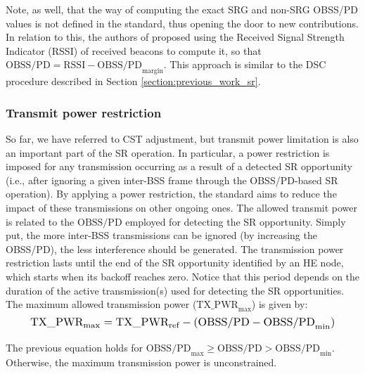 \documentclass{article}
\begin{document}
Note, as well, that the way of computing the exact SRG and non-SRG OBSS/PD values is not defined in the standard, thus opening the door to new contributions. In relation to this, the authors of \cite{tgax2016obss_pd_evaluation} proposed using the Received Signal Strength Indicator (RSSI) of received beacons to compute it, so that $\text{OBSS/PD} =  \text{RSSI} - \text{OBSS/PD}_{\text{margin}}$. This approach is similar to the DSC procedure described in Section \ref{section:previous_work_sr}.

\subsubsection{Transmit power restriction}	\label{section:tx_power_restriction}
So far, we have referred to CST adjustment, but transmit power limitation is also an important part of the SR operation. In particular, a power restriction is imposed for any transmission occurring as a result of a detected SR opportunity (i.e., after ignoring a given inter-BSS frame through the OBSS/PD-based SR operation). By applying a power restriction, the standard aims to reduce the impact of these transmissions on other ongoing ones. The allowed transmit power is related to the $\text{OBSS/PD}$ employed for detecting the SR opportunity. Simply put, the more inter-BSS transmissions can be ignored (by increasing the OBSS/PD), the less interference should be generated. The transmission power restriction lasts until the end of the SR opportunity identified by an HE node, which starts when its backoff reaches zero. Notice that this period depends on the duration of the active transmission(s) used for detecting the SR opportunities. The maximum allowed transmission power ($\text{TX\_PWR}_{\max}$) is given by:
\begin{equation}
\resizebox{0.9\textwidth}{!}{%
	$\text{TX\_PWR}_{\max} = \text{TX\_PWR}_{\text{ref}} - (\text{OBSS/PD} -\text{OBSS/PD}_{\min})$}
\label{eq:power_restriction}
\end{equation}

The previous equation holds for $\text{OBSS/PD}_{\max} \geq \text{OBSS/PD} > \text{OBSS/PD}_{\min}$. Otherwise, the maximum transmission power is unconstrained.
\end{document}
